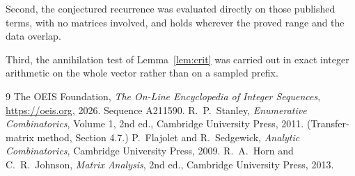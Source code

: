 \documentclass[11pt,a4paper]{article}
\theoremstyle{plain}
\theoremstyle{definition}
\begin{document}
Second, the conjectured recurrence was evaluated directly on those published terms, with no
matrices involved, and holds wherever the proved range and the data overlap.

Third, the annihilation test of Lemma~\ref{lem:crit} was carried out in exact integer
arithmetic on the whole vector rather than on a sampled prefix.

\begin{thebibliography}{9}
 The OEIS Foundation, \emph{The On-Line Encyclopedia of Integer
Sequences}, \url{https://oeis.org}, 2026. Sequence A211590.
 R.~P.~Stanley, \emph{Enumerative Combinatorics}, Volume 1, 2nd ed.,
Cambridge University Press, 2011. (Transfer-matrix method, Section 4.7.)
 P.~Flajolet and R.~Sedgewick, \emph{Analytic Combinatorics}, Cambridge
University Press, 2009.
 R.~A.~Horn and C.~R.~Johnson, \emph{Matrix Analysis}, 2nd ed., Cambridge
University Press, 2013.
\end{thebibliography}
\end{document}
